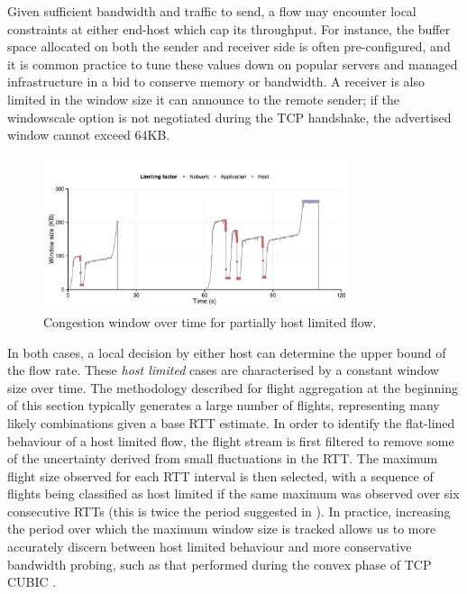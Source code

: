 Given sufficient bandwidth and traffic to send, a flow may encounter local constraints at either end-host which cap its throughput. 
For instance, the buffer space allocated on both the sender and receiver side is often pre-configured, and it is common practice to tune these values down on popular servers and managed infrastructure in a bid to conserve memory or bandwidth.
A receiver is also limited in the window size it can announce to the remote sender; if the windowscale option \cite{jacobson1992tcp} is not negotiated during the \ac{TCP} handshake, the advertised window cannot exceed 64KB.

\begin{figure}
\centering
  \includegraphics[width=0.8\textwidth]{figures/malawi/hostflow.pdf}
  \caption{Congestion window over time for partially host limited flow. \label{fig:hostlimited}}
\end{figure}

In both cases, a local decision by either host can determine the upper bound of the flow rate.
These \emph{host limited} cases are characterised by a constant window size over time.
The methodology described for flight aggregation at the beginning of this section typically generates a large number of flights, representing many likely combinations given a base \ac{RTT} estimate.
In order to identify the flat-lined behaviour of a host limited flow, the flight stream is first filtered to remove some of the uncertainty derived from small fluctuations in the \ac{RTT}.
The maximum flight size observed for each \ac{RTT} interval is then selected, with a sequence of flights being classified as host limited if the same maximum was observed over six consecutive \acp{RTT} (this is twice the period suggested in \cite{Zhang:2002p85}).
In practice, increasing the period over which the maximum window size is tracked allows us to more accurately discern between host limited behaviour and more conservative bandwidth probing, such as that performed during the convex phase of \ac{TCP} CUBIC \cite{Ha:2008p471}.

